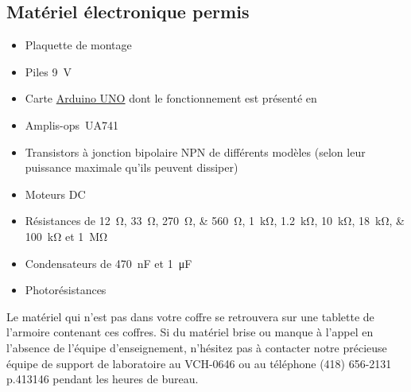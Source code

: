 \documentclass[english,french,12pt]{article}
\begin{document}
\subsection*{Matériel électronique permis}
\begin{itemize}
    \item Plaquette de montage
    \item Piles \SI{9}{\volt}
    \item Carte \href{https://www.arduino.cc/en/Guide/ArduinoUno}{Arduino UNO} dont le fonctionnement est présenté en 
    \item Amplis-ops~UA741
    \item Transistors à jonction bipolaire NPN de différents modèles (selon leur puissance maximale qu'ils peuvent dissiper)
    \item Moteurs DC
    \item Résistances de \SIlist[list-final-separator = {, }]{12;33;270;560}{\ohm}, \SIlist[list-final-separator = {, }]{1;1.2;10; 18;100}{\kilo\ohm} et \SI{1}{\mega\ohm}
    \item Condensateurs de \SI{470}{\nano\farad} et \SI{1}{\micro\farad}
    \item Photorésistances
\end{itemize}
Le matériel qui n'est pas dans votre coffre se retrouvera sur une tablette de l'armoire contenant ces coffres. Si du matériel brise ou manque à l'appel en l'absence de l'équipe d'enseignement, n'hésitez pas à contacter notre précieuse équipe de support de laboratoire au VCH-0646 ou au téléphone (418) 656-2131 p.413146 pendant les heures de bureau. 
\end{document}
